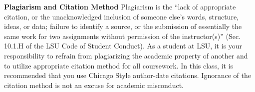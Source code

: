 \documentclass[11pt,article,oneside]{memoir}
\begin{document}
\noindent \textbf{Plagiarism and Citation Method}
Plagiarism is the ``lack of appropriate citation, or the unacknowledged inclusion of someone else's words, structure, ideas, or data; failure to identify a source, or the submission of essentially the same work for two assignments without permission of the instructor(s)'' (Sec. 10.1.H of the LSU Code of Student Conduct). As a student at LSU, it is your responsibility to refrain from plagiarizing the academic property of another and to utilize appropriate citation method for all coursework. In this class, it is recommended that you use Chicago Style author-date citations. Ignorance of the citation method is not an excuse for academic misconduct.
\end{document}
